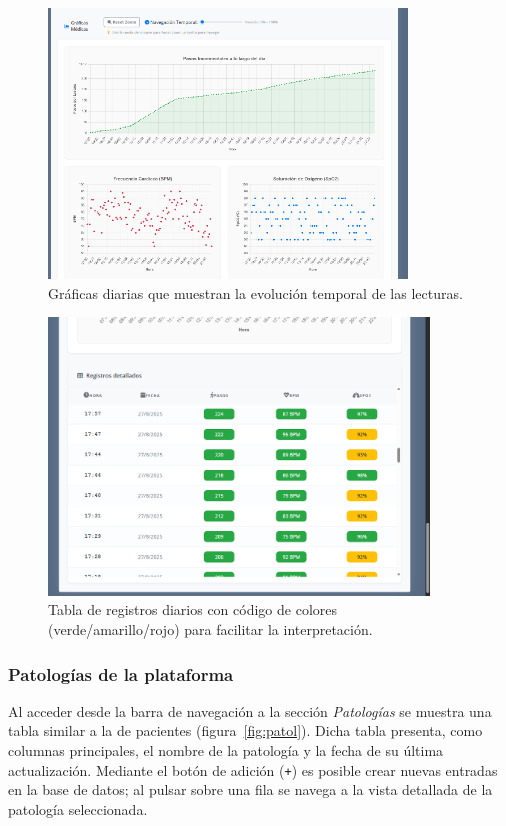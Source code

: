 \documentclass[12pt, a4paper]{article}
\begin{document}
\begin{umaappendices}
	\begin{figure}[htbp]
		\centering
		\includegraphics[width=0.85\textwidth]{images/8_estudio.png}
		\caption[Ejemplo]{Gráficas diarias que muestran la evolución temporal de las lecturas.}
		\label{fig:est15}
	\end{figure}

	\begin{figure}[htbp]
		\centering
		\includegraphics[width=0.9\textwidth]{images/8_estudio2.png}
		\caption[Ejemplo]{Tabla de registros diarios con código de colores (verde/amarillo/rojo) para facilitar la interpretación.}
		\label{fig:est2}
	\end{figure}
	
\subsubsection{Patologías de la plataforma}
Al acceder desde la barra de navegación a la sección \textit{Patologías} se muestra una tabla similar a la de pacientes (figura~\ref{fig:patol}). Dicha tabla presenta, como columnas principales, el nombre de la patología y la fecha de su última actualización. Mediante el botón de adición (\texttt{+}) es posible crear nuevas entradas en la base de datos; al pulsar sobre una fila se navega a la vista detallada de la patología seleccionada.


\end{umaappendices}
\end{document}
